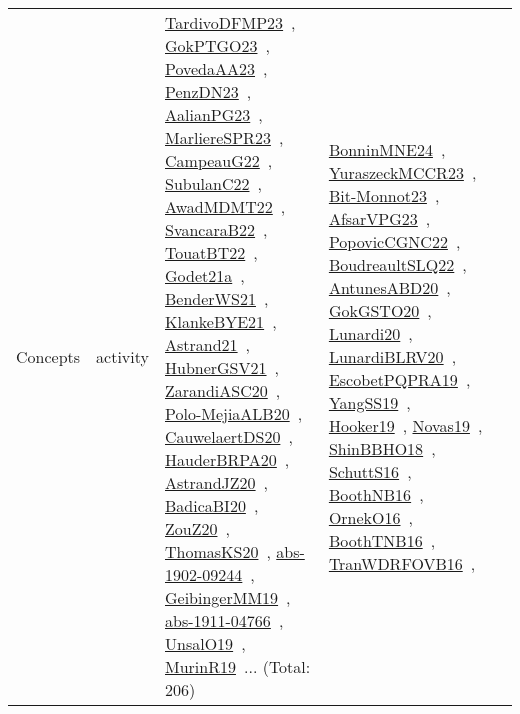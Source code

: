 {\begin{longtable}{lp{3cm}>{\raggedright\arraybackslash}p{6cm}>{\raggedright\arraybackslash}p{6cm}>{\raggedright\arraybackslash}p{8cm}}
Concepts & activity & \href{../works/TardivoDFMP23.pdf}{TardivoDFMP23}~\cite{TardivoDFMP23}, \href{../works/GokPTGO23.pdf}{GokPTGO23}~\cite{GokPTGO23}, \href{../works/PovedaAA23.pdf}{PovedaAA23}~\cite{PovedaAA23}, \href{../works/PenzDN23.pdf}{PenzDN23}~\cite{PenzDN23}, \href{../works/AalianPG23.pdf}{AalianPG23}~\cite{AalianPG23}, \href{../works/MarliereSPR23.pdf}{MarliereSPR23}~\cite{MarliereSPR23}, \href{../works/CampeauG22.pdf}{CampeauG22}~\cite{CampeauG22}, \href{../works/SubulanC22.pdf}{SubulanC22}~\cite{SubulanC22}, \href{../works/AwadMDMT22.pdf}{AwadMDMT22}~\cite{AwadMDMT22}, \href{../works/SvancaraB22.pdf}{SvancaraB22}~\cite{SvancaraB22}, \href{../works/TouatBT22.pdf}{TouatBT22}~\cite{TouatBT22}, \href{../works/Godet21a.pdf}{Godet21a}~\cite{Godet21a}, \href{../works/BenderWS21.pdf}{BenderWS21}~\cite{BenderWS21}, \href{../works/KlankeBYE21.pdf}{KlankeBYE21}~\cite{KlankeBYE21}, \href{../works/Astrand21.pdf}{Astrand21}~\cite{Astrand21}, \href{../works/HubnerGSV21.pdf}{HubnerGSV21}~\cite{HubnerGSV21}, \href{../works/ZarandiASC20.pdf}{ZarandiASC20}~\cite{ZarandiASC20}, \href{../works/Polo-MejiaALB20.pdf}{Polo-MejiaALB20}~\cite{Polo-MejiaALB20}, \href{../works/CauwelaertDS20.pdf}{CauwelaertDS20}~\cite{CauwelaertDS20}, \href{../works/HauderBRPA20.pdf}{HauderBRPA20}~\cite{HauderBRPA20}, \href{../works/AstrandJZ20.pdf}{AstrandJZ20}~\cite{AstrandJZ20}, \href{../works/BadicaBI20.pdf}{BadicaBI20}~\cite{BadicaBI20}, \href{../works/ZouZ20.pdf}{ZouZ20}~\cite{ZouZ20}, \href{../works/ThomasKS20.pdf}{ThomasKS20}~\cite{ThomasKS20}, \href{../works/abs-1902-09244.pdf}{abs-1902-09244}~\cite{abs-1902-09244}, \href{../works/GeibingerMM19.pdf}{GeibingerMM19}~\cite{GeibingerMM19}, \href{../works/abs-1911-04766.pdf}{abs-1911-04766}~\cite{abs-1911-04766}, \href{../works/UnsalO19.pdf}{UnsalO19}~\cite{UnsalO19}, \href{../works/MurinR19.pdf}{MurinR19}~\cite{MurinR19}... (Total: 206) & \href{../works/BonninMNE24.pdf}{BonninMNE24}~\cite{BonninMNE24}, \href{../works/YuraszeckMCCR23.pdf}{YuraszeckMCCR23}~\cite{YuraszeckMCCR23}, \href{../works/Bit-Monnot23.pdf}{Bit-Monnot23}~\cite{Bit-Monnot23}, \href{../works/AfsarVPG23.pdf}{AfsarVPG23}~\cite{AfsarVPG23}, \href{../works/PopovicCGNC22.pdf}{PopovicCGNC22}~\cite{PopovicCGNC22}, \href{../works/BoudreaultSLQ22.pdf}{BoudreaultSLQ22}~\cite{BoudreaultSLQ22}, \href{../works/AntunesABD20.pdf}{AntunesABD20}~\cite{AntunesABD20}, \href{../works/GokGSTO20.pdf}{GokGSTO20}~\cite{GokGSTO20}, \href{../works/Lunardi20.pdf}{Lunardi20}~\cite{Lunardi20}, \href{../works/LunardiBLRV20.pdf}{LunardiBLRV20}~\cite{LunardiBLRV20}, \href{../works/EscobetPQPRA19.pdf}{EscobetPQPRA19}~\cite{EscobetPQPRA19}, \href{../works/YangSS19.pdf}{YangSS19}~\cite{YangSS19}, \href{../works/Hooker19.pdf}{Hooker19}~\cite{Hooker19}, \href{../works/Novas19.pdf}{Novas19}~\cite{Novas19}, \href{../works/ShinBBHO18.pdf}{ShinBBHO18}~\cite{ShinBBHO18}, \href{../works/SchuttS16.pdf}{SchuttS16}~\cite{SchuttS16}, \href{../works/BoothNB16.pdf}{BoothNB16}~\cite{BoothNB16}, \href{../works/OrnekO16.pdf}{OrnekO16}~\cite{OrnekO16}, \href{../works/BoothTNB16.pdf}{BoothTNB16}~\cite{BoothTNB16}, \href{../works/TranWDRFOVB16.pdf}{TranWDRFOVB16}~\cite{TranWDRFOVB16}, 
\end{longtable}}
